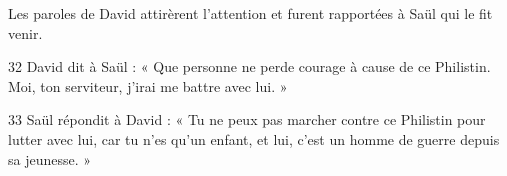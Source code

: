
Les paroles de David attirèrent l’attention et furent rapportées à Saül qui le fit venir.

32 David dit à Saül : « Que personne ne perde courage à cause de ce Philistin. Moi, ton serviteur, j’irai me battre avec lui. »

33 Saül répondit à David : « Tu ne peux pas marcher contre ce Philistin pour lutter avec lui, car tu n’es qu’un enfant, et lui, c’est un homme de guerre depuis sa jeunesse. »
